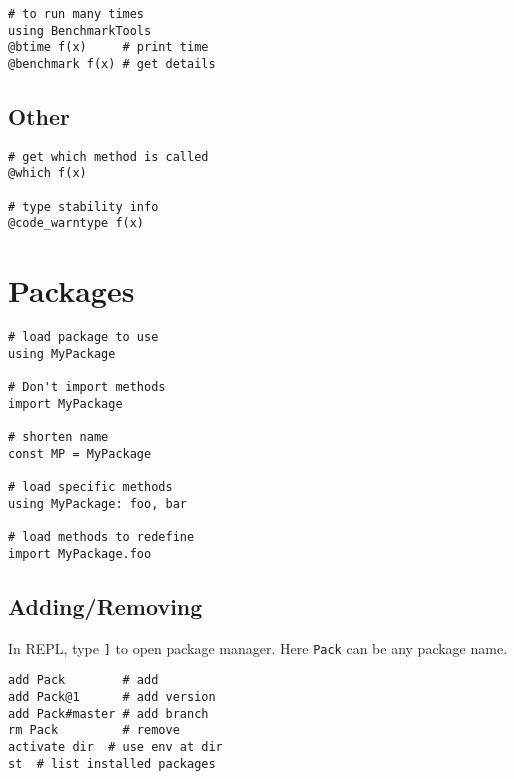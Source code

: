 \documentclass{article}
\begin{document}
\begin{multicols*}{3}
\begin{verbatim}
# to run many times
using BenchmarkTools
@btime f(x)     # print time
@benchmark f(x) # get details
\end{verbatim}

\subsection{Other}
\vspace*{-2mm}
\begin{verbatim}
# get which method is called
@which f(x)

# type stability info
@code_warntype f(x)
\end{verbatim}

\section{Packages}
\vspace*{-2mm}
\begin{verbatim}
# load package to use
using MyPackage 

# Don't import methods
import MyPackage

# shorten name
const MP = MyPackage

# load specific methods
using MyPackage: foo, bar 

# load methods to redefine 
import MyPackage.foo
\end{verbatim}

\subsection{Adding/Removing}
In REPL, type \texttt{]} to open 
package manager. Here \texttt{Pack}
can be any package name.
\begin{verbatim}
add Pack        # add
add Pack@1      # add version
add Pack#master # add branch
rm Pack         # remove
activate dir  # use env at dir
st  # list installed packages
\end{verbatim}



\end{multicols*}
\end{document}
